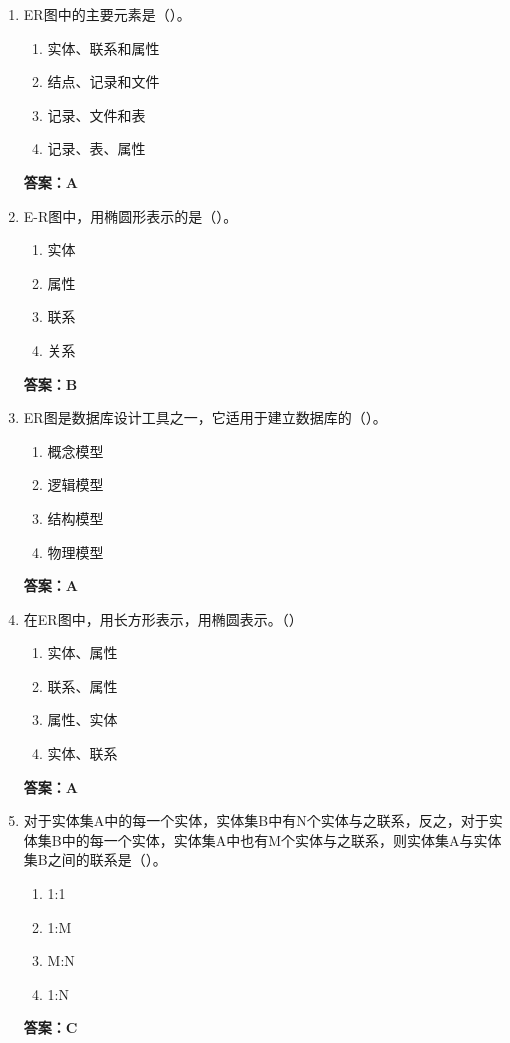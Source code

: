 \documentclass[12pt, a4paper]{article}
\begin{document}
\begin{enumerate}[label=\arabic*.]
	\item ER图中的主要元素是（\quad）。
	      \begin{enumerate}
		      \item 实体、联系和属性
		      \item 结点、记录和文件
		      \item 记录、文件和表
		      \item 记录、表、属性
	      \end{enumerate}
	      \textbf{答案：A}

	\item E-R图中，用椭圆形表示的是（\quad）。
	      \begin{enumerate}
		      \item 实体
		      \item 属性
		      \item 联系
		      \item 关系
	      \end{enumerate}
	      \textbf{答案：B}

	\item ER图是数据库设计工具之一，它适用于建立数据库的（\quad）。
	      \begin{enumerate}
		      \item 概念模型
		      \item 逻辑模型
		      \item 结构模型
		      \item 物理模型
	      \end{enumerate}
	      \textbf{答案：A}

	\item 在ER图中，用长方形表示，用椭圆表示。（\quad）
	      \begin{enumerate}
		      \item 实体、属性
		      \item 联系、属性
		      \item 属性、实体
		      \item 实体、联系
	      \end{enumerate}
	      \textbf{答案：A}

	\item 对于实体集A中的每一个实体，实体集B中有N个实体与之联系，反之，对于实体集B中的每一个实体，实体集A中也有M个实体与之联系，则实体集A与实体集B之间的联系是（\quad）。
	      \begin{enumerate}
		      \item 1:1
		      \item 1:M
		      \item M:N
		      \item 1:N
	      \end{enumerate}
	      \textbf{答案：C}


\end{enumerate}
\end{document}
